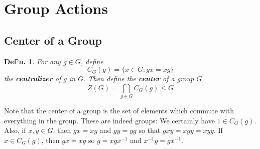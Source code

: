 \documentclass[12pt, a4paper]{book}
\newtheorem{definition}[theorem]{Def'n.}
\theoremstyle{nonumberplain}
\begin{document}
\section{Group Actions}
\subsection{Center of a Group}
\begin{definition}
    For any $g\in G$, define
    \[C_G(g)=\{x\in G:gx=xg\}\]
    the \textbf{centralizer} of $g$ in $G$.
    Then define the \textbf{center} of a group $G$
    \[Z(G)=\bigcap_{g\in G}C_G(g)\leq G\]
\end{definition}
Note that the center of a group is the set of elements which commute with everything in the group.
These are indeed groups:
We certainly have $1\in C_G(g)$.
Also, if $x,y\in G$, then $gx=xg$ and $gy=yg$ so that $gxy=xgy=xyg$.
If $x\in C_G(g)$, then $gx=xg$ so $g=xgx^{-1}$ and $x^{-1}g=gx^{-1}$.
\end{document}
